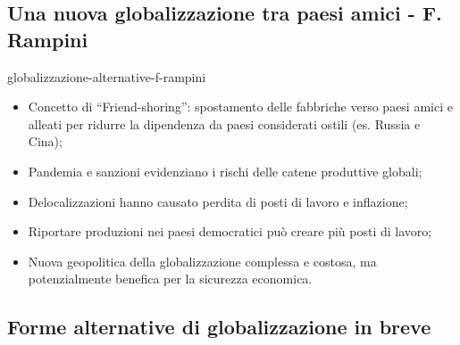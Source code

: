 \documentclass[preview]{standalone}
\begin{document}
\subsection{Una nuova globalizzazione tra paesi amici - F. Rampini}

\begin{snippet}{globalizzazione-alternative-f-rampini}
    \vspace{-0.25cm}
    \begin{itemize}
        \item Concetto di ``Friend-shoring'': spostamento delle fabbriche verso paesi amici e
            alleati per ridurre la dipendenza da paesi considerati ostili (es. Russia e Cina);
        \item Pandemia e sanzioni evidenziano i rischi delle catene produttive globali;
        \item Delocalizzazioni hanno causato perdita di posti di lavoro e inflazione;
        \item Riportare produzioni nei paesi democratici può creare più posti di lavoro;
        \item Nuova geopolitica della globalizzazione complessa e costosa, ma potenzialmente
            benefica per la sicurezza economica.
    \end{itemize}
\end{snippet}

\subsection{Forme alternative di globalizzazione in breve}
\end{document}
